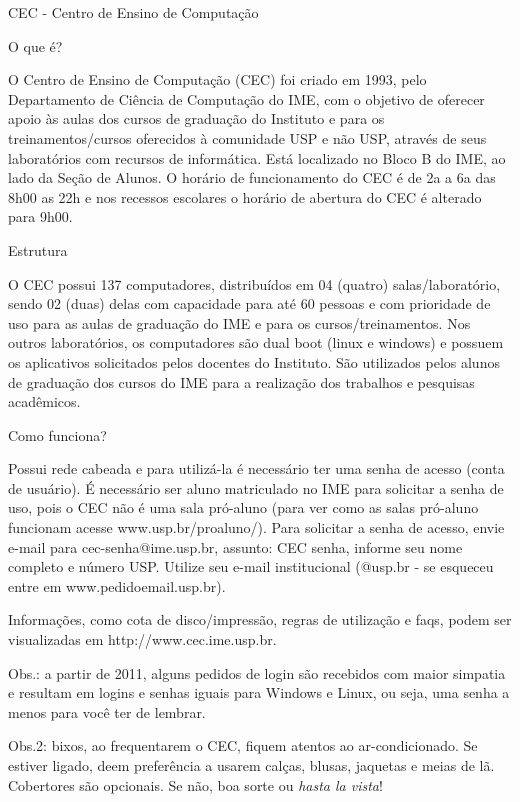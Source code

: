 \begin{secao}{CEC - Centro de Ensino de Computação}

\begin{subsecao}{O que é?}

O Centro de Ensino de Computação (CEC) foi criado em 1993, pelo
Departamento de Ciência de Computação do IME, com o objetivo de
oferecer apoio às aulas dos cursos de graduação do Instituto e para os
treinamentos/cursos oferecidos à comunidade USP e não USP, através de
seus laboratórios com recursos de informática.
Está localizado no Bloco B do IME, ao lado da Seção de Alunos. O horário
de funcionamento do CEC é de 2a a 6a das 8h00 as 22h e nos recessos
escolares o horário de abertura do CEC é alterado para 9h00.

\end{subsecao}

\begin{subsecao}{Estrutura}

O CEC possui 137 computadores, distribuídos em 04 (quatro)
salas/laboratório, sendo 02 (duas) delas com capacidade para até 60
pessoas e com prioridade de uso para as aulas de graduação do IME e
para os cursos/treinamentos.
Nos outros laboratórios, os computadores são dual boot (linux e windows) e
possuem os aplicativos solicitados pelos docentes do Instituto. São
utilizados pelos alunos de graduação dos cursos do IME para a realização
dos trabalhos e pesquisas acadêmicos.

\end{subsecao}

\begin{subsecao}{Como funciona?}

Possui rede cabeada e para utilizá-la é necessário ter uma senha de
acesso (conta de usuário). É necessário ser aluno matriculado no IME para
solicitar a senha de uso, pois o CEC não é uma sala pró-aluno (para ver
como as salas pró-aluno funcionam acesse www.usp.br/proaluno/). 
Para solicitar a senha de acesso, envie e-mail para cec-senha@ime.usp.br,
assunto: CEC senha, informe seu nome completo e número USP. Utilize
seu e-mail institucional (@usp.br - se esqueceu entre em
www.pedidoemail.usp.br).

Informações, como cota de disco/impressão, regras de utilização e faqs,
podem ser visualizadas em http://www.cec.ime.usp.br.

\end{subsecao}

Obs.: a partir de 2011, alguns pedidos de login são recebidos com maior simpatia
e resultam em logins e senhas iguais para Windows e Linux, ou seja, uma senha a
menos para você ter de lembrar.

Obs.2: bixos, ao frequentarem o CEC, fiquem atentos ao ar-condicionado. Se
estiver ligado, deem preferência a usarem calças, blusas, jaquetas e meias de
lã. Cobertores são opcionais. Se não, boa sorte ou \textit{hasta la vista}!

\end{secao}
